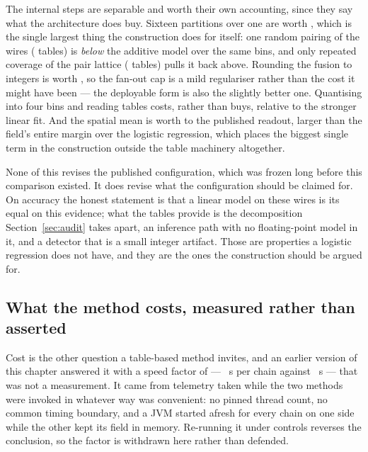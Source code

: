 \documentclass[11pt]{article}
\begin{document}
The internal steps are separable and worth their own accounting, since they say
what the architecture does buy. Sixteen partitions over one are worth
\RdOneRoundDelta{} \RdOneRoundCI{}, which is the single largest thing the
construction does for itself: one random pairing of the wires
(\RdOneRoundTables{} tables) is \emph{below} the additive model over the same
bins, and only repeated coverage of the pair lattice (\RdNTables{} tables) pulls
it back above. Rounding the fusion to integers is worth \RdUnroundedDelta{}
\RdUnroundedCI{}, so the fan-out cap is a mild regulariser rather than the cost
it might have been --- the deployable form is also the slightly better one.
Quantising into four bins and reading tables costs, rather than buys, relative
to the stronger linear fit. And the spatial mean is worth \RdFieldGain{} to the
published readout, larger than the field's entire margin over the logistic
regression, which places the biggest single term in the construction outside the
table machinery altogether.

None of this revises the published configuration, which was frozen long before
this comparison existed. It does revise what the configuration should be claimed
for. On accuracy the honest statement is that a linear model on these wires is
its equal on this evidence; what the tables provide is the decomposition
Section~\ref{sec:audit} takes apart, an inference path with no floating-point
model in it, and a detector that is a small integer artifact. Those are
properties a logistic regression does not have, and they are the ones the
construction should be argued for.

\subsection{What the method costs, measured rather than asserted}
\label{sec:cost}
Cost is the other question a table-based method invites, and an earlier version of
this chapter answered it with a speed factor of \TabSpeedup{} --- \TabRuntime{}~s
per chain against \PTwoRuntime{}~s --- that was not a measurement. It came from
telemetry taken while the two methods were invoked in
whatever way was convenient: no pinned thread count, no common timing boundary,
and a JVM started afresh for every chain on one side while the other kept its
field in memory. Re-running it under controls reverses the conclusion, so the
factor is withdrawn here rather than defended.
\end{document}
